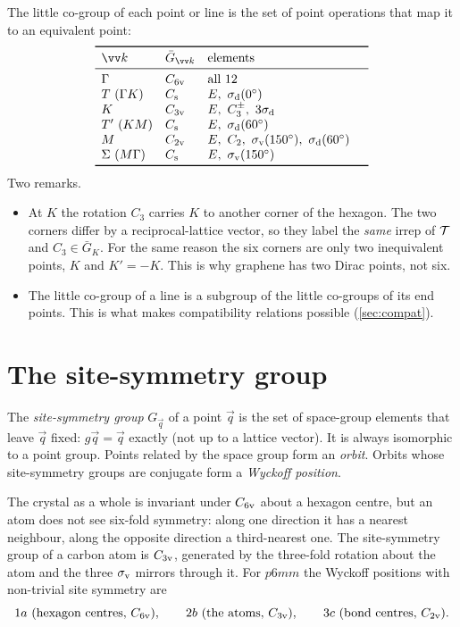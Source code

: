 The little co-group of each point or line is the set of point operations that map it
to an equivalent point:
\begin{equation}\label{eq:littlegroups}
\begin{array}{llll}
\toprule
\vec{k} & \bar{G}_{\vec{k}} & \text{elements} & \\
\midrule
\Gamma & \Cv{6} & \text{all 12} &\\
T\ (\Gamma K) & \Cs & E,\ \sd(0^\circ) &\\
K & \Cv{3} & E,\ C_3^\pm,\ 3\sd &\\
T'\ (KM) & \Cs & E,\ \sd(60^\circ) &\\
M & \Cv{2} & E,\ C_2,\ \sv(150^\circ),\ \sd(60^\circ) &\\
\Sigma\ (M\Gamma) & \Cs & E,\ \sv(150^\circ) &\\
\bottomrule
\end{array}
\end{equation}
Two remarks.
\begin{itemize}
\item At $K$ the rotation $C_3$ carries $K$ to another corner of the hexagon. The two
      corners differ by a reciprocal-lattice vector, so they label the \emph{same} irrep
      of $\mathcal{T}$ and $C_3\in\bar{G}_K$. For the same reason the six corners are only
      two inequivalent points, $K$ and $K'=-K$. This is why graphene has two Dirac
      points, not six.
\item The little co-group of a line is a subgroup of the little co-groups of its end
      points. This is what makes compatibility relations possible
      (\cref{sec:compat}).
\end{itemize}

\section{The site-symmetry group}\label{sec:sitesym}

\begin{definition}
The \emph{site-symmetry group} $G_{\vec{q}}$ of a point $\vec{q}$ is the set of
space-group elements that leave $\vec{q}$ fixed: $g\vec{q}=\vec{q}$ exactly (not up to a
lattice vector). It is always isomorphic to a point group. Points related by the space
group form an \emph{orbit}. Orbits whose site-symmetry groups are conjugate form a
\emph{Wyckoff position}.
\end{definition}
The crystal as a whole is invariant under $C_{6\mathrm{v}}$ about a hexagon centre, but an atom
does not see six-fold symmetry: along one direction it has a nearest neighbour, along
the opposite direction a third-nearest one. The site-symmetry group of a carbon atom
is $C_{3\mathrm{v}}$, generated by the three-fold rotation about the atom and the three $\sigma_{\mathrm{v}}$
mirrors through it. For $p6mm$ the Wyckoff positions with non-trivial site symmetry
are
\[
1a\ \text{(hexagon centres, }C_{6\mathrm{v}}),\qquad
2b\ \text{(the atoms, }C_{3\mathrm{v}}),\qquad
3c\ \text{(bond centres, }C_{2\mathrm{v}}).
\]

